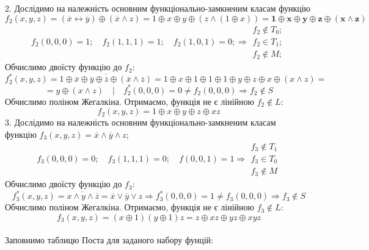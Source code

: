 \documentclass[14pt,a4paper]{scrartcl}
\theoremstyle{definition}
\theoremstyle{remark}
\theoremstyle{definition}
\theoremstyle{definition}
\begin{document}
2. Дослідимо на належність основним функціонально-замкненим класам функцію
$f_2(x, y, z) = (\overline{x} \leftrightarrow \overline{y}) \oplus (\overline{x} \land z) = 1 \oplus x \oplus y \oplus (z \land (1\oplus x)) =
\mathbf{1 \oplus x \oplus y \oplus z \oplus (x \land z)}
$
$$
f_2(0, 0, 0) = 1; \quad f_2(1, 1, 1) = 1; \quad f_2(1,0,1) = 0; \Longrightarrow \begin{gathered}
 f_2\notin T_0;\\
 f_2 \in T_1;\\
 f_2 \notin M;
\end{gathered}
$$
Обчислимо двоїсту функцію до $f_2:$
$$f_2^*(x,y,z) = \overline{1 \oplus \overline{x} \oplus \overline{y} \oplus \overline{z} \oplus (\overline{x} \land \overline{z})} =
1 \oplus x \oplus 1 \oplus 1 \oplus 1 \oplus y \oplus z \oplus x \oplus (x \land z)=
$$
$$ = y \oplus (x \land z) \quad | \quad f^*_2 (0,0,0) = 0 \neq f_2(0,0,0) \Longrightarrow f_2 \notin S $$
Обчислимо поліном Жегалкіна. Отримаємо, функція не є лінійною $f_2 \notin L$:
$$f_2 (x,y,z) = 1 \oplus x\oplus y\oplus z \oplus xz$$
3. Дослідимо на належність основним функціонально-замкненим класам\\ функцію
$f_3(x, y, z) = \overline{x} \land \overline{y} \land z$;\\
$$f_3(0,0,0) = 0; \quad f_3(1,1,1) = 0; \quad f(0,0,1) = 1 \Longrightarrow \begin{gathered}
 f_3 \notin T_1\\
 f_3 \in T_0\\
 f_3 \notin M
\end{gathered}
$$
Обчислимо двоїсту функцію до $f_3:$
$$f_3^*(x,y,z) = \overline{x \land y \land \overline{z}} = \overline{x} \lor \overline{y} \lor z \Longrightarrow f_3^*(0,0,0) = 1 \neq  f_3(0,0,0)\Longrightarrow f_3 \notin S
$$
Обчислимо поліном Жегалкіна. Отримаємо, функція не є лінійною $f_3 \notin L$:
$$f_3 (x,y,z) = (x \oplus 1)(y\oplus 1)z = z \oplus xz \oplus yz \oplus xyz$$
\pagebreak\\
Заповнимо таблицю Поста для заданого набору фунцій:\\
\end{document}
